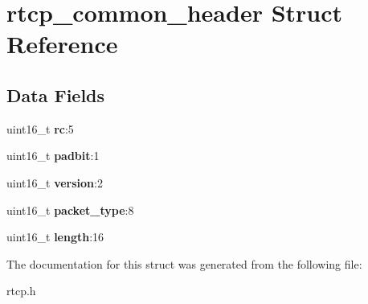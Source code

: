 \section{rtcp\+\_\+common\+\_\+header Struct Reference}
\label{structrtcp__common__header}
\subsection*{Data Fields}
\begin{DoxyCompactItemize}
\item 
\mbox{\label{structrtcp__common__header_a79a625f0d1e20232d1a13095bb26f0fb}} 
uint16\+\_\+t {\bfseries rc}\+:5
\item 
\mbox{\label{structrtcp__common__header_a0b17572e590e077f7bda94d86ff188d6}} 
uint16\+\_\+t {\bfseries padbit}\+:1
\item 
\mbox{\label{structrtcp__common__header_ab0d326ce750d0b2e97c97ed405e24530}} 
uint16\+\_\+t {\bfseries version}\+:2
\item 
\mbox{\label{structrtcp__common__header_a5632d87e32ab543e074f596a4a128a9e}} 
uint16\+\_\+t {\bfseries packet\+\_\+type}\+:8
\item 
\mbox{\label{structrtcp__common__header_a6c76dd78c1919438226a4354050a242c}} 
uint16\+\_\+t {\bfseries length}\+:16
\end{DoxyCompactItemize}


The documentation for this struct was generated from the following file\+:\begin{DoxyCompactItemize}
\item 
rtcp.\+h\end{DoxyCompactItemize}
